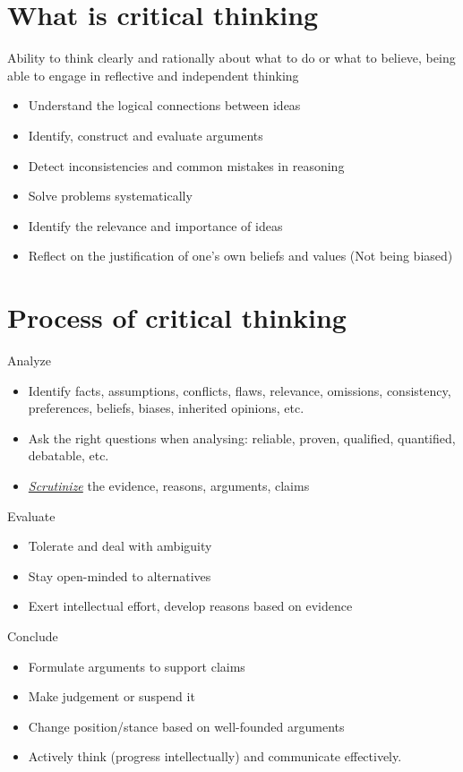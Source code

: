 \documentclass{article}
\newcommand{\worddef}[1]{\hyperref[sec:reference]{\textit{#1}}}
\begin{document}
\tableofcontents

\newpage

\section{What is critical thinking}

\begin{flushleft}
Ability to think clearly and rationally about what to do or what to believe, being able to engage in reflective and independent thinking 
\end{flushleft}
\begin{itemize}
  \item Understand the logical connections between ideas
  \item Identify, construct and evaluate arguments
  \item Detect inconsistencies and common mistakes in reasoning
  \item Solve problems systematically
  \item Identify the relevance and importance of ideas
  \item Reflect on the justification of one's own beliefs and values (Not being biased)
\end{itemize}

\section{Process of critical thinking}

Analyze
  \begin{itemize}
    \item Identify facts, assumptions, conflicts, flaws, relevance, omissions, consistency, preferences, beliefs, biases, inherited opinions, etc. 
    \item Ask the right questions when analysing: reliable, proven, qualified, quantified, debatable, etc.
    \item \worddef{Scrutinize} the evidence, reasons, arguments, claims
  \end{itemize}
Evaluate
  \begin{itemize}
    \item Tolerate and deal with ambiguity
    \item Stay open-minded to alternatives
    \item Exert intellectual effort, develop reasons based on evidence
  \end{itemize}
Conclude
  \begin{itemize}
    \item Formulate arguments to support claims
    \item Make judgement or suspend it
    \item Change position/stance based on well-founded arguments
    \item Actively think (progress intellectually) and communicate effectively.
  \end{itemize}
\end{document}
